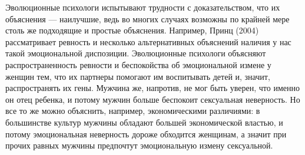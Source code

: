 \documentclass[11pt]{book}
\begin{document}
Эволюционные психологи испытывают трудности с доказательством, что их объяснения --- наилучшие, ведь во многих случаях возможны по крайней мере столь же подходящие и простые объяснения. Например, Принц (2004) рассматривает ревность и несколько альтернативных объяснений наличия у нас такой эмоциональной диспозиции. Эволюционные психологи объясняют распространенность ревности и беспокойства об эмоциональной измене у женщин тем, что их партнеры помогают им воспитывать детей и, значит, распространять их гены. Мужчина же, напротив, не мог быть уверен, что именно он отец ребенка, и потому мужчин больше беспокоит сексуальная неверность. Но все то же можно объяснить, например, экономическими различиями: в большинстве культур мужчины обладают большей экономической властью, и потому эмоциональная неверность дороже обходится женщинам, а значит при прочих равных мужчины предпочтут эмоциональную измену сексуальной.
\end{document}
